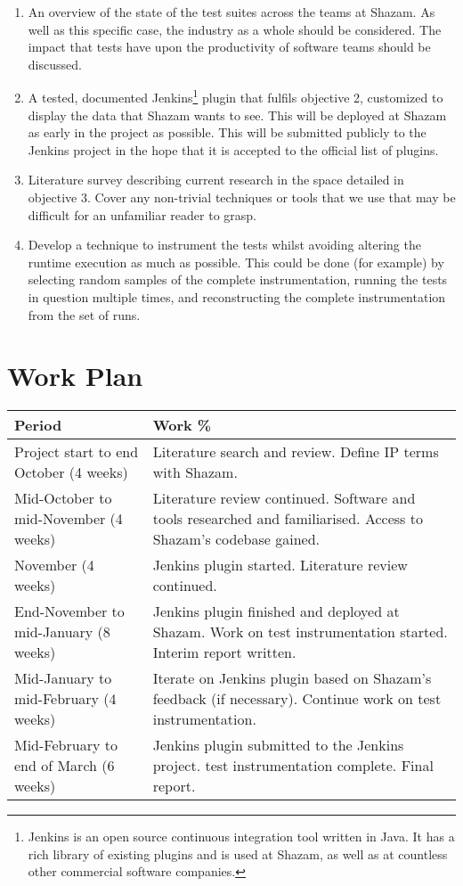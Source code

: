 \begin{enumerate}
	\item{
		An overview of the state of the test suites across the teams at Shazam. As well as this specific case, the industry as a whole should be considered. The impact that \flaky{} tests have upon the productivity of software teams should be discussed.
	}
	\item{
		A tested, documented Jenkins\footnote{Jenkins is an open source continuous integration tool written in Java. It has a rich library of existing plugins and is used at Shazam, as well as at countless other commercial software companies.} plugin that fulfils objective 2, customized to display the data that Shazam wants to see. This will be deployed at Shazam as early in the project as possible. This will be submitted publicly to the Jenkins project in the hope that it is accepted to the official list of plugins.
	}
	\item{
		Literature survey describing current research in the space detailed in objective 3. Cover any non-trivial techniques or tools that we use that may be difficult for an unfamiliar reader to grasp.
	}
	\item{
		Develop a technique to instrument the \flaky{} tests whilst avoiding altering the runtime execution as much as possible. This could be done (for example) by selecting random samples of the complete instrumentation, running the tests in question multiple times, and reconstructing the complete instrumentation from the set of runs.
	}
\end{enumerate}

\section{Work Plan}

\begin{center}
    \begin{tabular}{ | l | p{6cm} |}
    \hline
    Period & Work \% \\ \hline
    Project start to end October (4 weeks) & Literature search and review. Define IP terms with Shazam. \\ \hline
    Mid-October to mid-November (4 weeks) & Literature review continued. Software and tools researched and familiarised. Access to Shazam's codebase gained. \\ \hline
    November (4 weeks) & Jenkins plugin started. Literature review continued. \\ \hline
    End-November to mid-January (8 weeks) & Jenkins plugin finished and deployed at Shazam. Work on \flaky{} test instrumentation started. Interim report written. \\ \hline
    Mid-January to mid-February (4 weeks) & Iterate on Jenkins plugin based on Shazam's feedback (if necessary). Continue work on \flaky{} test instrumentation. \\ \hline
    Mid-February to end of March (6 weeks) & Jenkins plugin submitted to the Jenkins project. \flaky{} test instrumentation complete. Final report. \\ \hline
    \end{tabular}
\end{center}

\newpage

\setcounter{section}{\value{oldSectionCounter2}}
\setcounter{page}{\value{oldPageCounter2}}